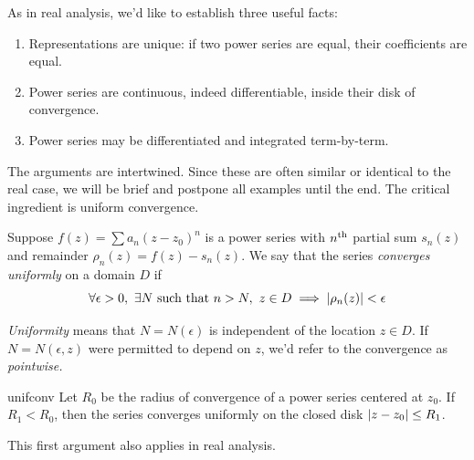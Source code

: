 As in real analysis, we'd like to establish three useful facts:
\begin{enumerate}
  \item Representations are unique: if two power series are equal, their coefficients are equal.
  \item Power series are continuous, indeed differentiable, inside their disk of convergence.
  \item Power series may be differentiated and integrated term-by-term.
\end{enumerate}

The arguments are intertwined. Since these are often similar or identical to the real case, we will be brief and postpone all examples until the end. The critical ingredient is uniform convergence.

\begin{defn}{}{}
	Suppose $f(z)=\sum a_n(z-z_0)^n$ is a power series with $n\textsuperscript{th}$ partial sum $s_n(z)$ and remainder $\rho_n(z) = f(z) - s_n(z)$. We say that the series \emph{converges uniformly} on a domain $D$ if
	\[
		\forall\epsilon>0,\ \exists N\text{ such that }n>N,\ z\in D\implies \left| \rho_n(z)\right|<\epsilon
	\]
\end{defn}

\emph{Uniformity} means that $N=N(\epsilon)$ is independent of the location $z\in D$. If $N=N(\epsilon,z)$ were permitted to depend on $z$, we'd refer to the convergence as \emph{pointwise.}

\begin{thm}{}{unifconv}
	Let $R_0$ be the radius of convergence of a power series centered at $z_0$. If $R_1<R_0$, then the series converges uniformly on the closed disk $\left| z-z_0\right|\le R_1$.
\end{thm}

This first argument also applies in real analysis.

